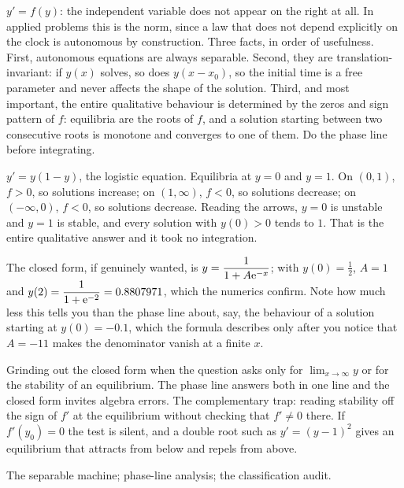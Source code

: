 \cue $y'=f(y)$: the independent variable does not appear on the right at all. In applied problems this is the norm, since a law that does not depend explicitly on the clock is autonomous by construction.
\method Three facts, in order of usefulness. First, autonomous equations are always separable. Second, they are translation-invariant: if $y(x)$ solves, so does $y(x-x_0)$, so the initial time is a free parameter and never affects the shape of the solution. Third, and most important, the entire qualitative behaviour is determined by the zeros and sign pattern of $f$: equilibria are the roots of $f$, and a solution starting between two consecutive roots is monotone and converges to one of them. Do the phase line before integrating.

\begin{worked}
$y'=y(1-y)$, the logistic equation. Equilibria at $y=0$ and $y=1$. On $(0,1)$, $f>0$, so solutions increase; on $(1,\infty)$, $f<0$, so solutions decrease; on $(-\infty,0)$, $f<0$, so solutions decrease. Reading the arrows, $y=0$ is unstable and $y=1$ is stable, and every solution with $y(0)>0$ tends to $1$. That is the entire qualitative answer and it took no integration.

The closed form, if genuinely wanted, is $y=\dfrac{1}{1+A\mathrm{e}^{-x}}$; with $y(0)=\tfrac12$, $A=1$ and $y(2)=\dfrac{1}{1+\mathrm{e}^{-2}}=0.8807971$, which the numerics confirm. Note how much less this tells you than the phase line about, say, the behaviour of a solution starting at $y(0)=-0.1$, which the formula describes only after you notice that $A=-11$ makes the denominator vanish at a finite $x$.
\end{worked}

\begin{trap}
Grinding out the closed form when the question asks only for $\lim_{x\to\infty}y$ or for the stability of an equilibrium. The phase line answers both in one line and the closed form invites algebra errors. The complementary trap: reading stability off the sign of $f'$ at the equilibrium without checking that $f'\neq0$ there. If $f'(y_0)=0$ the test is silent, and a double root such as $y'=(y-1)^{2}$ gives an equilibrium that attracts from below and repels from above.
\end{trap}

\begin{seealsob}The separable machine; phase-line analysis; the classification audit.\end{seealsob}

